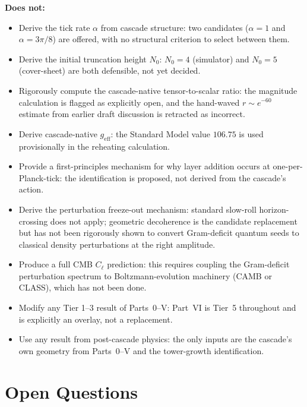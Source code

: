 \documentclass[12pt,a4paper]{article}
\begin{document}
\textbf{Does not:}
\begin{itemize}[leftmargin=*,nosep]
\item Derive the tick rate $\alpha$ from cascade structure: two candidates
($\alpha = 1$ and $\alpha = 3\pi/8$) are offered, with no structural criterion
to select between them.
\item Derive the initial truncation height $N_0$: $N_0 = 4$ (simulator) and
$N_0 = 5$ (cover-sheet) are both defensible, not yet decided.
\item Rigorously compute the cascade-native tensor-to-scalar ratio: the
magnitude calculation is flagged as explicitly open, and the hand-waved
$r \sim e^{-60}$ estimate from earlier draft discussion is retracted as
incorrect.
\item Derive cascade-native $g_{\mathrm{eff}}$: the Standard Model value
$106.75$ is used provisionally in the reheating calculation.
\item Provide a first-principles mechanism for why layer addition occurs at
one-per-Planck-tick: the identification is proposed, not derived from the
cascade's action.
\item Derive the perturbation freeze-out mechanism: standard slow-roll
horizon-crossing does not apply; geometric decoherence is the candidate
replacement but has not been rigorously shown to convert Gram-deficit quantum
seeds to classical density perturbations at the right amplitude.
\item Produce a full CMB $C_\ell$ prediction: this requires coupling the
Gram-deficit perturbation spectrum to Boltzmann-evolution machinery (CAMB or
CLASS), which has not been done.
\item Modify any Tier 1--3 result of Parts~0--V: Part~VI is Tier~5 throughout
and is explicitly an overlay, not a replacement.
\item Use any result from post-cascade physics: the only inputs are the
cascade's own geometry from Parts~0--V and the tower-growth identification.
\end{itemize}

\section{Open Questions}
\label{sec:open}
\end{document}

